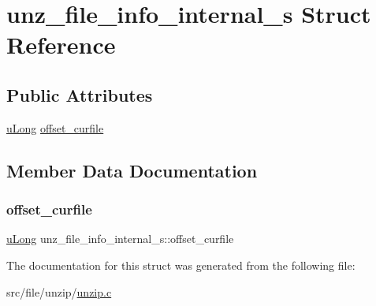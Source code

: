 \hypertarget{structunz__file__info__internal__s}{}\section{unz\+\_\+file\+\_\+info\+\_\+internal\+\_\+s Struct Reference}
\label{structunz__file__info__internal__s}
\subsection*{Public Attributes}
\begin{DoxyCompactItemize}
\item 
\hyperlink{ioapi_8h_a50e9e9d5c30e481de822ad68fe537986}{u\+Long} \hyperlink{structunz__file__info__internal__s_a23d3a1c3584888bdf066d7bfed95f62e}{offset\+\_\+curfile}
\end{DoxyCompactItemize}


\subsection{Member Data Documentation}
\mbox{\label{structunz__file__info__internal__s_a23d3a1c3584888bdf066d7bfed95f62e}} 
\subsubsection{\texorpdfstring{offset\+\_\+curfile}{offset\_curfile}}
{\footnotesize\ttfamily \hyperlink{ioapi_8h_a50e9e9d5c30e481de822ad68fe537986}{u\+Long} unz\+\_\+file\+\_\+info\+\_\+internal\+\_\+s\+::offset\+\_\+curfile}



The documentation for this struct was generated from the following file\+:\begin{DoxyCompactItemize}
\item 
src/file/unzip/\hyperlink{unzip_8c}{unzip.\+c}\end{DoxyCompactItemize}
